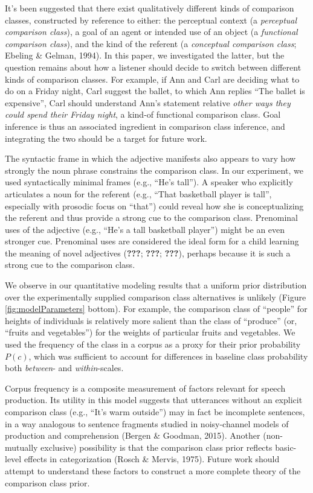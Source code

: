 \documentclass[doc]{apa6}
\begin{document}
It's been suggested that there exist qualitatively different kinds of
comparison classes, constructed by reference to either: the perceptual
context (a \emph{perceptual comparison class}), a goal of an agent or
intended use of an object (a \emph{functional comparison class}), and
the kind of the referent (a \emph{conceptual comparison class}; Ebeling
\& Gelman, 1994). In this paper, we investigated the latter, but the
question remains about how a listener should decide to switch between
different kinds of comparison classes. For example, if Ann and Carl are
deciding what to do on a Friday night, Carl suggest the ballet, to which Ann replies ``The
ballet is expensive'', Carl should understand Ann's statement relative
 \emph{other ways they could spend their Friday night}, a kind-of
functional comparison class. Goal inference is thus an associated
ingredient in comparison class inference, and integrating the two
should be a target for future work.

The syntactic frame in which the adjective manifests also appears to
vary how strongly the noun phrase constrains the comparison class. In
our experiment, we used syntactically minimal frames (e.g., ``He's
tall''). A speaker who explicitly articulates a noun for the referent
(e.g., ``That basketball player is tall'', especially with
prosodic focus on ``that'') could reveal how she is
conceptualizing the referent and thus provide a strong cue to the
comparison class. Prenominal uses of the adjective (e.g., ``He's
a tall basketball player'') might be an even stronger cue. Prenominal
uses are considered the ideal form for a child learning the meaning of
novel adjectives ({\textbf{???}}; {\textbf{???}}; {\textbf{???}}),
perhaps because it is such a strong cue to the comparison class.

We observe in our quantitative modeling results that a uniform prior
distribution over the experimentally supplied comparison class
alternatives is unlikely (Figure \ref{fig:modelParameters} bottom). For
example, the comparison class of ``people'' for heights of
individuals is relatively more salient than the class of
``produce'' (or, ``fruits and vegetables'') for the weights
of particular fruits and vegetables. We used the frequency of the class
in a corpus as a proxy for their prior probability \(P(c)\), which was
sufficient to account for differences in baseline class probability both
\emph{between}- and \emph{within}-scales.

Corpus frequency is a composite measurement of factors relevant for
speech production. Its utility in this model suggests that utterances
without an explicit comparison class (e.g., ``It's warm outside'')
may in fact be incomplete sentences, in a way analogous to sentence
fragments studied in noisy-channel models of production and
comprehension (Bergen \& Goodman, 2015). Another (non-mutually
exclusive) possibility is that the comparison class prior reflects
basic-level effects in categorization (Rosch \& Mervis, 1975). Future
work should attempt to understand these factors to construct a more
complete theory of the comparison class prior.
\end{document}
